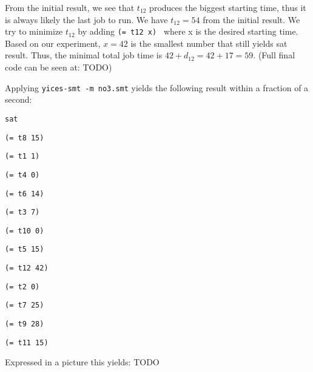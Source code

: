 \documentclass[12pt]{article}
\begin{document}
From the initial result, we see that $t_{12}$ produces the biggest starting time, thus it is always likely the last job to run. We have $t_{12}=54$ from the initial result. We try to minimize $t_{12}$ by adding {\tt (= t12 x) } where x is the desired starting time. Based on our experiment, $x=42$ is the smallest number that still yields sat result. Thus, the minimal total job time is $42+d_{12}=42+17=59$. (Full final code can be seen at: TODO)

Applying {\tt yices-smt -m no3.smt} yields the following result
within a fraction of a second: 

{\footnotesize
{\tt sat }

{\tt  }

{\tt (= t8 15) }

{\tt (= t1 1) }

{\tt (= t4 0) }

{\tt (= t6 14) }

{\tt (= t3 7) }

{\tt (= t10 0) }

{\tt (= t5 15) }

{\tt (= t12 42) }

{\tt (= t2 0) }

{\tt (= t7 25) }

{\tt (= t9 28) }

{\tt (= t11 15) }

{\tt  }
}
Expressed in a picture this yields: TODO
\end{document}
